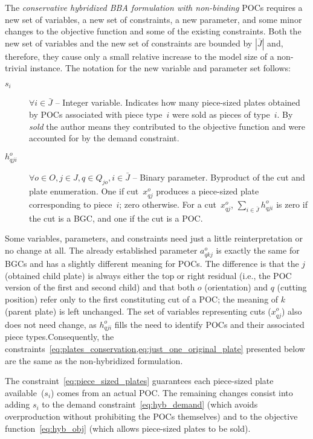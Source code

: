 \documentclass[ppgc,tese,english,formais,babel]{iiufrgs}
\begin{document}
The \emph{conservative hybridized BBA formulation with non-binding} POCs requires a new set of variables, a new set of constraints, a new parameter, and some minor changes to the objective function and some of the existing constraints.
Both the new set of variables and the new set of constraints are bounded by \(|\bar{J}|\) and, therefore, they cause only a small relative increase to the model size of a non-trivial instance.
The notation for the new variable and parameter set follows:

\begin{description}
\item [\(s_i\)] \(\forall i \in \bar{J}\) -- Integer variable. Indicates how many piece-sized plates obtained by POCs associated with piece type~\(i\) were sold as pieces of type~\(i\). By \emph{sold} the author means they contributed to the objective function and were accounted for by the demand constraint.
\item [\(h^o_{qji}\)] \(\forall o \in O, j \in J, q \in Q_{jo}, i \in \bar{J}\) -- Binary parameter. Byproduct of the cut and plate enumeration. One if cut~\(x^o_{qj}\) produces a piece-sized plate corresponding to piece~\(i\); zero otherwise. For a cut~\(x^o_{qj}\), \(\sum_{i\in\bar{J}} h^o_{qji}\) is zero if the cut is a BGC, and one if the cut is a POC.
\end{description}

Some variables, parameters, and constraints need just a little reinterpretation or no change at all.
The already established parameter \(a^o_{qkj}\) is exactly the same for BGCs and has a slightly different meaning for POCs.
The difference is that the \(j\) (obtained child plate) is always either the top or right residual (i.e., the POC version of the first and second child) and that both \(o\) (orientation) and \(q\) (cutting position) refer only to the first constituting cut of a POC; the meaning of \(k\) (parent plate) is left unchanged.
The set of variables representing cuts (\(x^o_{qj}\)) also does not need change, as \(h^o_{qji}\) fills the need to identify POCs and their associated piece types.Consequently, the constraints~\eqref{eq:plates_conservation,eq:just_one_original_plate} presented below are the same as the non-hybridized formulation.

The constraint~\eqref{eq:piece_sized_plates} guarantees each piece-sized plate available~(\(s_i\)) comes from an actual POC.
The remaining changes consist into adding \(s_i\) to the demand constraint~\eqref{eq:hyb_demand} (which avoids overproduction without prohibiting the POCs themselves) and to the objective function~\eqref{eq:hyb_obj} (which allows piece-sized plates to be sold).
\end{document}
